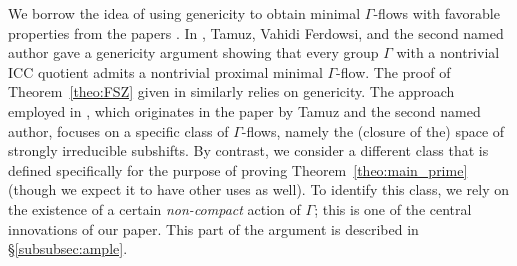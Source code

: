 \documentclass[11pt,reqno,psamsfonts]{amsart}
\theoremstyle{bfnote}
\theoremstyle{definition}
\theoremstyle{remark}
\newcommand{\0}{\varnothing}
\newcommand{\red}[1]{{\color{red}#1}}
\newcommand{\todo}[1]{\red{\textbf{\upshape{[#1]}}}}
\newcommand{\G}{\Gamma}
\numberwithin{equation}{section}
\begin{document}
    
    We borrow the idea of using genericity to obtain minimal $\G$-flows with favorable properties from the papers \cite{FTVF,FSZ}. In \cite{FTVF}, Tamuz, Vahidi Ferdowsi, and the second named author gave a genericity argument showing that every group $\G$ with a nontrivial ICC quotient admits a nontrivial proximal minimal $\G$-flow. The proof of Theorem~\ref{theo:FSZ} given in \cite{FSZ} similarly relies on genericity. The approach employed in \cite{FTVF,FSZ}, which originates in the paper \cite{FT} by Tamuz and the second named author, focuses on a specific class of $\G$-flows, namely the (closure of the) space of {strongly irreducible subshifts}. By contrast, we consider a different class that is defined specifically for the purpose of proving Theorem~\ref{theo:main_prime} (though we expect it to have other uses as well). To identify this class, we rely on the existence of a certain \emph{non-compact} action of $\G$; this is one of the central innovations of our paper. This part of the argument is described in %
    \S\ref{subsubsec:ample}.
    
\end{document}

